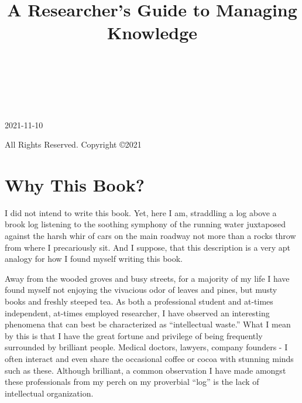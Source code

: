 \documentclass[
  notoc %
]{tufte-book}
\title{A Researcher's Guide to Managing Knowledge}
\author{\noindent{Jacob S. Zelko}\\[3mm] }
\date{}
\begin{document}
\makeatletter
\thispagestyle{empty}
\vfill
{\Huge\bf
\noindent
\@title
}\\[1in]
{\Large
\noindent
\@author
}
\makeatother

\makeatletter
\newpage
\thispagestyle{empty}
\vfill
{\noindent

}
\vfill
{\small


2021-11-10

All Rights Reserved. Copyright ©2021
}
\makeatother


\frontmatter
\mainmatter
{}

\setcounter{tocdepth}{1}
\tableofcontents

\justifying

\setlength{\parindent}{0pt}

\hypertarget{why-this-book}{%
\chapter{Why This Book? 📖}\label{why-this-book}}

I did not intend to write this book. Yet, here I am, straddling a log
above a brook log listening to the soothing symphony of the running
water juxtaposed against the harsh whir of cars on the main roadway not
more than a rocks throw from where I precariously sit. And I suppose,
that this description is a very apt analogy for how I found myself
writing this book.

Away from the wooded groves and busy streets, for a majority of my life
I have found myself not enjoying the vivacious odor of leaves and pines,
but musty books and freshly steeped tea. As both a professional student
and at-times independent, at-times employed researcher, I have observed
an interesting phenomena that can best be characterized as
``intellectual waste.'' What I mean by this is that I have the great
fortune and privilege of being frequently surrounded by brilliant
people. Medical doctors, lawyers, company founders - I often interact
and even share the occasional coffee or cocoa with stunning minds such
as these. Although brilliant, a common observation I have made amongst
these professionals from my perch on my proverbial ``log'' is the lack
of intellectual organization.
\end{document}
